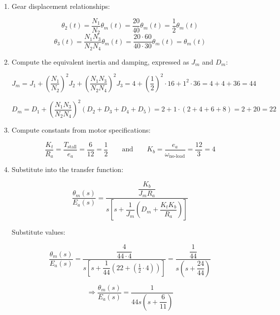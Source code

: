 \documentclass[11pt]{article}
\begin{document}
\begin{enumerate}[label=(\alph*), itemindent=*, leftmargin=*, nolistsep]
    
    \item Gear displacement relationships:
    
    \[
    \theta_2(t) = \frac{N_1}{N_2} \theta_m(t) = \frac{20}{40} \theta_m(t) = \frac{1}{2} \theta_m(t)
    \]
    \[
    \theta_3(t) = \frac{N_1 N_3}{N_2 N_4} \theta_m(t) = \frac{20 \cdot 60}{40 \cdot 30} \theta_m(t) = \theta_m(t)
    \]
    
    \item Compute the equivalent inertia and damping, expressed as \( J_m \) and \( D_m \):
    
    \[
    J_m = J_1 + \left( \frac{N_1}{N_2} \right)^2 J_2 + \left( \frac{N_1 N_3}{N_2 N_4} \right)^2 J_3
    = 4 + \left( \frac{1}{2} \right)^2 \cdot 16 + 1^2 \cdot 36 = 4 + 4 + 36 = 44
    \]
    
    \[
    D_m = D_1 + \left( \frac{N_1 N_3}{N_2 N_4} \right)^2 (D_2 + D_3 + D_4 + D_5)
    = 2 + 1 \cdot (2 + 4 + 6 + 8) = 2 + 20 = 22
    \]
    
    \item Compute constants from motor specifications:
    
    \[
    \frac{K_t}{R_a} = \frac{T_{\text{stall}}}{e_a} = \frac{6}{12} = \frac{1}{2}
    \qquad \text{and} \qquad
    K_b = \frac{e_a}{\omega_{\text{no-load}}} = \frac{12}{3} = 4
    \]
    
    \item Substitute into the transfer function:
    
    \[
    \frac{\theta_m(s)}{E_a(s)} = 
    \frac{\dfrac{K_b}{J_m R_a}}{
    s \left[ s + \dfrac{1}{J_m} \left( D_m + \dfrac{K_t K_b}{R_a} \right) \right]}
    \]
    
    Substitute values:
    
    \[
    \frac{\theta_m(s)}{E_a(s)} = 
    \frac{\dfrac{4}{44 \cdot 4}}{
    s \left[ s + \dfrac{1}{44} \left( 22 + \left( \frac{1}{2} \cdot 4 \right) \right) \right]}
    = \frac{\dfrac{1}{44}}{
    s \left( s + \dfrac{24}{44} \right)}
    \]
    
    \[
    \Rightarrow
    \boxed{
        \frac{\theta_m(s)}{E_a(s)} =
        \frac{1}{44 s \left( s + \dfrac{6}{11} \right)}
    }
    \]
    
\end{enumerate}

\end{document}
